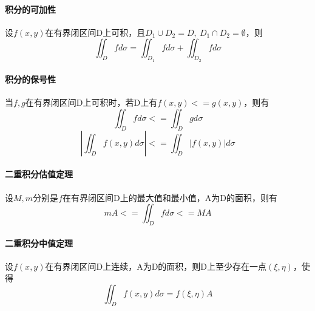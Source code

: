 \paragraph{积分的可加性}
设\(f(x, y)\)在有界闭区间D上可积，且\(D_1\cup D_2 = D,\ D_1 \cap D_2 = \emptyset\)，则
\[\iint_Dfd\sigma = \iint_{D_1}fd\sigma + \iint_{D_2}fd\sigma\]

\paragraph{积分的保号性}
当\(f, g\)在有界闭区间D上可积时，若D上有\(f(x, y) <= g(x, y)\)，则有\[\iint_Dfd\sigma <= \iint_Dgd\sigma\]
\[|\iint_Df(x, y)d\sigma| <= \iint_D|f(x, y)|d\sigma\]

\paragraph{二重积分估值定理}
设\(M, m\)分别是\(f\)在有界闭区间D上的最大值和最小值，A为D的面积，则有
\[mA <= \iint_Dfd\sigma <= MA\]

\paragraph{二重积分中值定理}
设\(f(x, y)\)在有界闭区间D上连续，A为D的面积，则D上至少存在一点\((\xi, \eta)\)，使得
\[\iint_Df(x, y)d\sigma = f(\xi, \eta)A\]


